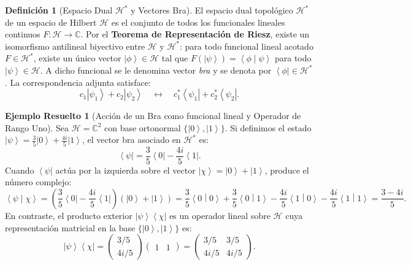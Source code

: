 \documentclass[11pt,a4paper,twoside]{report}
\theoremstyle{definition}
\newtheorem{definicion}{Definición}[chapter]
\newtheorem{ejemplo}{Ejemplo Resuelto}[chapter]
\theoremstyle{plain}
\theoremstyle{remark}
\newcommand{\ket}[1]{\left| #1 \right\rangle}
\newcommand{\bra}[1]{\left\langle #1 \right|}
\newcommand{\braket}[2]{\left\langle #1 \middle| #2 \right\rangle}
\newcommand{\ketbra}[2]{\left| #1 \right\rangle\!\left\langle #2 \right|}
\newcommand{\Hil}{\mathcal{H}}
\begin{document}
\begin{definicion}[Espacio Dual $\Hil^*$ y Vectores Bra]
El espacio dual topológico $\Hil^*$ de un espacio de Hilbert $\Hil$ es el conjunto de todos los funcionales lineales continuos $F: \Hil \to \mathbb{C}$. Por el \textbf{Teorema de Representación de Riesz}, existe un isomorfismo antilineal biyectivo entre $\Hil$ y $\Hil^*$: para todo funcional lineal acotado $F \in \Hil^*$, existe un único vector $\ket{\phi} \in \Hil$ tal que $F(\ket{\psi}) = \braket{\phi}{\psi}$ para todo $\ket{\psi} \in \Hil$. A dicho funcional se le denomina vector \textit{bra} y se denota por $\bra{\phi} \in \Hil^*$. La correspondencia adjunta satisface:
\begin{equation}
    c_1 \ket{\psi_1} + c_2 \ket{\psi_2} \quad \longleftrightarrow \quad c_1^* \bra{\psi_1} + c_2^* \bra{\psi_2}.
\end{equation}
\end{definicion}

\begin{ejemplo}[Acción de un Bra como funcional lineal y Operador de Rango Uno]
Sea $\Hil = \mathbb{C}^2$ con base ortonormal $\{\ket{0}, \ket{1}\}$. Si definimos el estado $\ket{\psi} = \frac{3}{5}\ket{0} + \frac{4i}{5}\ket{1}$, el vector bra asociado en $\Hil^*$ es:
\begin{equation}
    \bra{\psi} = \frac{3}{5}\bra{0} - \frac{4i}{5}\bra{1}.
\end{equation}
Cuando $\bra{\psi}$ actúa por la izquierda sobre el vector $\ket{\chi} = \ket{0} + \ket{1}$, produce el número complejo:
\begin{equation}
    \braket{\psi}{\chi} = \left(\frac{3}{5}\bra{0} - \frac{4i}{5}\bra{1}\right)\left(\ket{0} + \ket{1}\right) = \frac{3}{5}\braket{0}{0} + \frac{3}{5}\braket{0}{1} - \frac{4i}{5}\braket{1}{0} - \frac{4i}{5}\braket{1}{1} = \frac{3 - 4i}{5}.
\end{equation}
En contraste, el producto exterior $\ketbra{\psi}{\chi}$ es un operador lineal sobre $\Hil$ cuya representación matricial en la base $\{\ket{0}, \ket{1}\}$ es:
\begin{equation}
    \ketbra{\psi}{\chi} = \begin{pmatrix} 3/5 \\ 4i/5 \end{pmatrix} \begin{pmatrix} 1 & 1 \end{pmatrix} = \begin{pmatrix} 3/5 & 3/5 \\ 4i/5 & 4i/5 \end{pmatrix}.
\end{equation}
\end{ejemplo}
\end{document}
